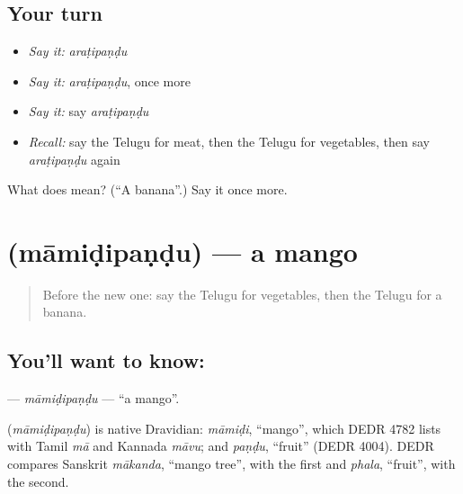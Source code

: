 \subsection*{Your turn}
\begin{itemize}
\raggedright
  \item \emph{Say it:} \emph{araṭipaṇḍu}
  \item \emph{Say it:} \emph{araṭipaṇḍu}, once more
  \item \emph{Say it:} say \emph{araṭipaṇḍu}
  \item \emph{Recall:} say the Telugu for meat, then the Telugu for vegetables, then say \emph{araṭipaṇḍu} again
\end{itemize}

\begin{tcolorbox}[breakable,colback=teal!4,colframe=teal!35!black,title={Before you move on}]
What does  mean? (\textquotedblleft{}A banana\textquotedblright{}.) Say it once more.
\end{tcolorbox}
\section[\texorpdfstring{\te{మామిడిపండు} (māmiḍipaṇḍu)}{మామిడిపండు (māmiḍipaṇḍu)}]{ (māmiḍipaṇḍu) — a mango}

\label{lesson:TE-C117-mamidipandu}



\begin{quote}
Before the new one: say the Telugu for vegetables, then the Telugu for a banana.
\end{quote}

\subsection*{You'll want to know: }
\textbf{} — \emph{māmiḍipaṇḍu} — \textquotedblleft{}a mango\textquotedblright{}.

\begin{cousinweb}
\textbf{} (\emph{māmiḍipaṇḍu}) is native Dravidian: \emph{māmiḍi}, \textquotedblleft{}mango\textquotedblright{}, which DEDR 4782 lists with Tamil \emph{mā} and Kannada \emph{māvu}; and \emph{paṇḍu}, \textquotedblleft{}fruit\textquotedblright{} (DEDR 4004). DEDR compares Sanskrit \emph{mākanda}, \textquotedblleft{}mango tree\textquotedblright{}, with the first and \emph{phala}, \textquotedblleft{}fruit\textquotedblright{}, with the second.
\end{cousinweb}


